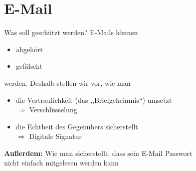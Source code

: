 \section{E-Mail}
\begin{frame}{Was soll geschützt werden?}
  E-Mails können
  \begin{itemize}
    \item abgehört
    \item gefälscht
  \end{itemize}
  werden. \pause Deshalb stellen wir vor, wie man
  \begin{itemize}
      \pause
    \item die Vertraulichkeit (das ,,Briefgeheimnis``) umsetzt
    \\ $\Rightarrow$ Verschlüsselung
    \pause
    \item die Echtheit des Gegenübers sicherstellt
    \\ $\Rightarrow$ Digitale Signatur
  \end{itemize}
  \pause \textbf{Außerdem:} Wie man sicherstellt, dass sein E-Mail Passwort\\ nicht einfach mitgelesen werden kann
\end{frame}

\renewcommand{\emailtext}{Von: Alice@provider1.de\\An: Bob@provider2.com\\Betreff: Hallo\\Hallo Bob, wie gehts dir?\\LG Alice}
\renewcommand{\emailciphertext}{Von: Alice@provider1.de\\An: Bob@provider2.com\\Betreff: Hallo\\\colorbox{blue}{\parbox[t][1.2em][t]{.88\messagewidth}{~}}}
\settowidth{\messagewidth}{\tiny Hallo Bob, wie gehts dir?}

